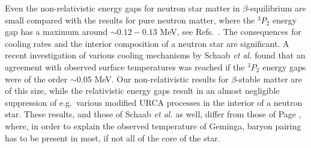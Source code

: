  
Even the non-relativistic energy gaps for neutron star matter in
$\beta$-equilibrium are small compared with the results for pure
neutron
matter, where the $^3P_2$ energy gap 
has a maximum around $\sim 0.12-0.13$ MeV, see Refs.\
\cite{eeho96a,tt93,ao85}. 
The  consequences for cooling rates 
and the interior composition of a neutron
star are significant. A recent investigation of various cooling 
mechanisms by Schaab {\em et al.} \cite{swwg96} found that 
an agreement with observed surface temperatures 
was reached if the $^3P_2$
energy gaps were of the order $\sim 0.05$ MeV. Our non-relativistic
results for $\beta$-stable matter are of this size, while the 
relativistic energy gaps result in an almost  negligible 
suppression
of e.g.\ various modified URCA processes
in the interior of a neutron star.
These results, and those of Schaab {\em et al.} 
\cite{swwg96} as well,
differ from those of Page \cite{page94}, 
where, in order
to explain the observed temperature of Geminga, baryon pairing has to 
be present in most, if not all of the core of the star.



